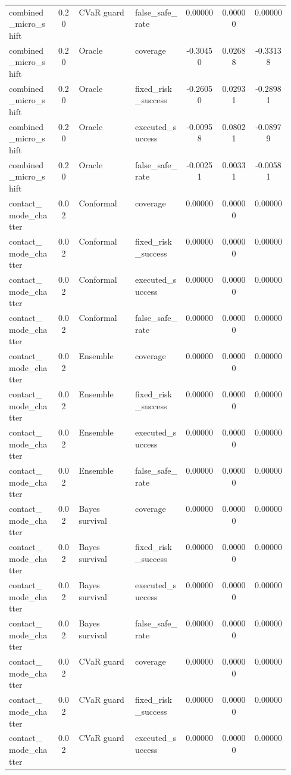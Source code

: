\documentclass{article}
\begin{document}
\begin{center}
\begin{longtable}{p{0.17\linewidth}cp{0.20\linewidth}p{0.18\linewidth}ccc}
combined\_micro\_shift & 0.20 & CVaR guard & false\_safe\_rate & 0.00000 & 0.00000 & 0.00000\\
combined\_micro\_shift & 0.20 & Oracle & coverage & -0.30450 & 0.02688 & -0.33138\\
combined\_micro\_shift & 0.20 & Oracle & fixed\_risk\_success & -0.26050 & 0.02931 & -0.28981\\
combined\_micro\_shift & 0.20 & Oracle & executed\_success & -0.00958 & 0.08021 & -0.08979\\
combined\_micro\_shift & 0.20 & Oracle & false\_safe\_rate & -0.00251 & 0.00331 & -0.00581\\
contact\_mode\_chatter & 0.02 & Conformal & coverage & 0.00000 & 0.00000 & 0.00000\\
contact\_mode\_chatter & 0.02 & Conformal & fixed\_risk\_success & 0.00000 & 0.00000 & 0.00000\\
contact\_mode\_chatter & 0.02 & Conformal & executed\_success & 0.00000 & 0.00000 & 0.00000\\
contact\_mode\_chatter & 0.02 & Conformal & false\_safe\_rate & 0.00000 & 0.00000 & 0.00000\\
contact\_mode\_chatter & 0.02 & Ensemble & coverage & 0.00000 & 0.00000 & 0.00000\\
contact\_mode\_chatter & 0.02 & Ensemble & fixed\_risk\_success & 0.00000 & 0.00000 & 0.00000\\
contact\_mode\_chatter & 0.02 & Ensemble & executed\_success & 0.00000 & 0.00000 & 0.00000\\
contact\_mode\_chatter & 0.02 & Ensemble & false\_safe\_rate & 0.00000 & 0.00000 & 0.00000\\
contact\_mode\_chatter & 0.02 & Bayes survival & coverage & 0.00000 & 0.00000 & 0.00000\\
contact\_mode\_chatter & 0.02 & Bayes survival & fixed\_risk\_success & 0.00000 & 0.00000 & 0.00000\\
contact\_mode\_chatter & 0.02 & Bayes survival & executed\_success & 0.00000 & 0.00000 & 0.00000\\
contact\_mode\_chatter & 0.02 & Bayes survival & false\_safe\_rate & 0.00000 & 0.00000 & 0.00000\\
contact\_mode\_chatter & 0.02 & CVaR guard & coverage & 0.00000 & 0.00000 & 0.00000\\
contact\_mode\_chatter & 0.02 & CVaR guard & fixed\_risk\_success & 0.00000 & 0.00000 & 0.00000\\
contact\_mode\_chatter & 0.02 & CVaR guard & executed\_success & 0.00000 & 0.00000 & 0.00000\\

\end{longtable}
\end{center}
\end{document}
